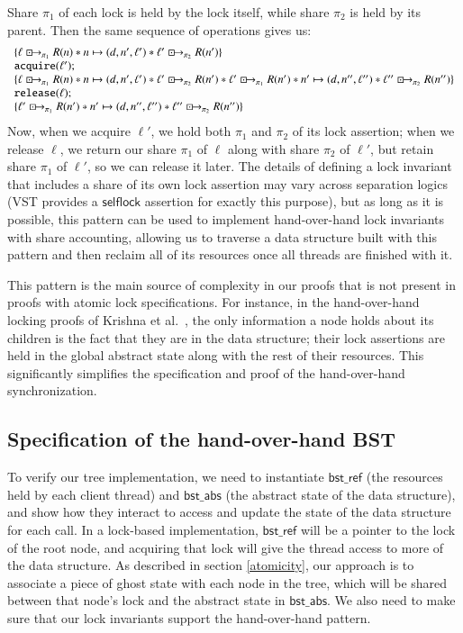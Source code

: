 \documentclass[runningheads]{llncs}
\newcommand{\islock}{\boxdotright}
\newcommand{\treerep}{\ensuremath{\mathsf{bst\_abs}}}
\newcommand{\nodeboxrep}{\ensuremath{\mathsf{bst\_ref}}}
\begin{document}
Share $\pi_1$ of each lock is held by the lock itself, while share $\pi_2$ is held by its parent. Then the same sequence of operations gives us:
$$\begin{array}{l}
\{ \ell \islock_{\pi_1} R(n) * n \mapsto (d, n', \ell') * \ell' \islock_{\pi_2} R(n') \}\\
\texttt{acquire}(\ell');\\
\{ \ell \islock_{\pi_1} R(n) * n \mapsto (d, n', \ell') * \ell' \islock_{\pi_2} R(n') * \ell' \islock_{\pi_1} R(n') * n' \mapsto (d, n'', \ell'') * \ell'' \islock_{\pi_2} R(n'') \}\\
\texttt{release}(\ell);\\
\{ \ell' \islock_{\pi_1} R(n') * n' \mapsto (d, n'', \ell'') * \ell'' \islock_{\pi_2} R(n'') \}
\end{array}$$
Now, when we acquire $\ell'$, we hold both $\pi_1$ and $\pi_2$ of its lock assertion; when we release $\ell$, we return our share $\pi_1$ of $\ell$ along with share $\pi_2$ of $\ell'$, but retain share $\pi_1$ of $\ell'$, so we can release it later. The details of defining a lock invariant that includes a share of its own lock assertion may vary across separation logics (VST provides a $\mathsf{selflock}$ assertion for exactly this purpose), but as long as it is possible, this pattern can be used to implement hand-over-hand lock invariants with share accounting, allowing us to traverse a data structure built with this pattern and then reclaim all of its resources once all threads are finished with it.

This pattern is the main source of complexity in our proofs that is not present in proofs with atomic lock specifications. For instance, in the hand-over-hand locking proofs of Krishna et al.~\cite{templates}, the only information a node holds about its children is the fact that they are in the data structure; their lock assertions are held in the global abstract state along with the rest of their resources. This significantly simplifies the specification and proof of the hand-over-hand synchronization.

\subsection{Specification of the hand-over-hand BST}

To verify our tree implementation, we need to instantiate $\nodeboxrep$ (the resources held by each client thread) and $\treerep$ (the abstract state of the data structure), and show how they interact to access and update the state of the data structure for each call. In a lock-based implementation, $\nodeboxrep$ will be a pointer to the lock of the root node, and acquiring that lock will give the thread access to more of the data structure. As described in section \ref{atomicity}, our approach is to associate a piece of ghost state with each node in the tree, which will be shared between that node's lock and the abstract state in $\treerep$. We also need to make sure that our lock invariants support the hand-over-hand pattern.
\end{document}
